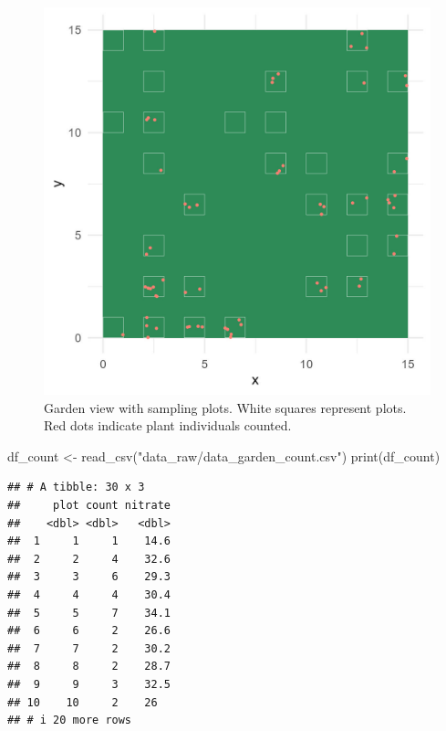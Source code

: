 \documentclass[
]{book}
\newenvironment{Shaded}{\begin{snugshade}}{\end{snugshade}}
\newcommand{\FunctionTok}[1]{\textcolor[rgb]{0.00,0.00,0.00}{#1}}
\newcommand{\NormalTok}[1]{#1}
\newcommand{\OtherTok}[1]{\textcolor[rgb]{0.56,0.35,0.01}{#1}}
\newcommand{\StringTok}[1]{\textcolor[rgb]{0.31,0.60,0.02}{#1}}
\begin{document}
\begin{figure}

{\centering \includegraphics[width=16.67in]{image/figure_garden} 

}

\caption{Garden view with sampling plots. White squares represent plots. Red dots indicate plant individuals counted.}\label{fig:garden-recall}
\end{figure}

\begin{Shaded}
\begin{Highlighting}[]
\NormalTok{df\_count }\OtherTok{\textless{}{-}} \FunctionTok{read\_csv}\NormalTok{(}\StringTok{"data\_raw/data\_garden\_count.csv"}\NormalTok{)}
\FunctionTok{print}\NormalTok{(df\_count)}
\end{Highlighting}
\end{Shaded}

\begin{verbatim}
## # A tibble: 30 x 3
##     plot count nitrate
##    <dbl> <dbl>   <dbl>
##  1     1     1    14.6
##  2     2     4    32.6
##  3     3     6    29.3
##  4     4     4    30.4
##  5     5     7    34.1
##  6     6     2    26.6
##  7     7     2    30.2
##  8     8     2    28.7
##  9     9     3    32.5
## 10    10     2    26  
## # i 20 more rows
\end{verbatim}
\end{document}
